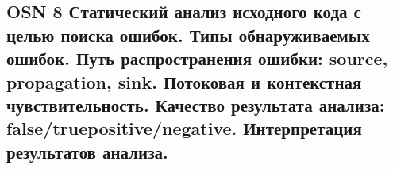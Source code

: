 \subsection{OSN 8 Статический анализ исходного кода с целью поиска ошибок. Типы обнаруживаемых ошибок. Путь распространения ошибки: source, propagation, sink. Потоковая и контекстная чувствительность. Качество результата анализа: false/truepositive/negative. Интерпретация результатов анализа.}
